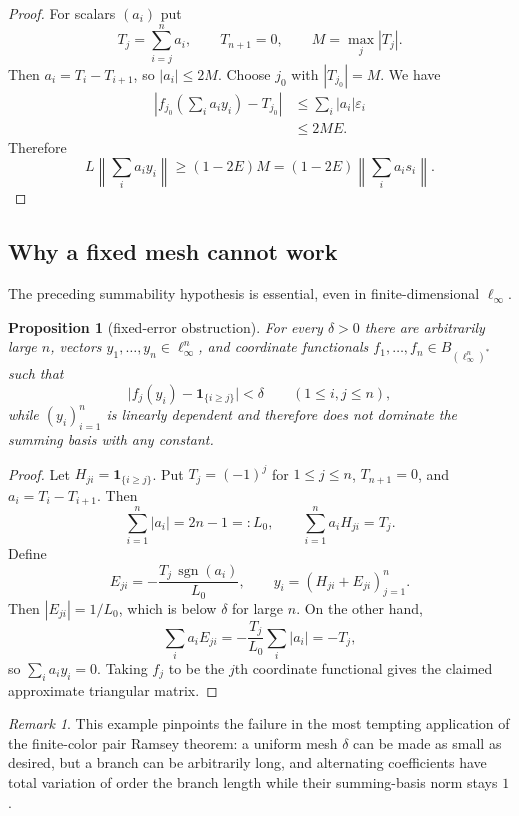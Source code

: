 \documentclass[11pt]{article}
\newtheorem{proposition}[theorem]{Proposition}
\theoremstyle{definition}
\theoremstyle{remark}
\newtheorem{remark}[theorem]{Remark}
\newcommand{\eps}{\varepsilon}
\begin{document}
\begin{proof}
For scalars $(a_i)$ put
\[
   T_j=\sum_{i=j}^n a_i,\qquad T_{n+1}=0,
   \qquad M=\max_j|T_j|.
\]
Then $a_i=T_i-T_{i+1}$, so $|a_i|\leq2M$.  Choose $j_0$ with $|T_{j_0}|=M$.  We have
\begin{align*}
 \left|f_{j_0}\left(\sum_i a_i y_i\right)-T_{j_0}\right|
 &\leq\sum_i|a_i|\eps_i\\
 &\leq2ME.
\end{align*}
Therefore
\[
  L\left\|\sum_i a_i y_i\right\|
  \geq (1-2E)M
  =(1-2E)\left\|\sum_i a_i s_i\right\|.
\]
\end{proof}

\subsection{Why a fixed mesh cannot work}

The preceding summability hypothesis is essential, even in finite-dimensional $\ell_\infty$.

\begin{proposition}[fixed-error obstruction]\label{prop:fixed-error-obstruction}
For every $\delta>0$ there are arbitrarily large $n$, vectors $y_1,\dots,y_n\in\ell_\infty^n$, and coordinate functionals $f_1,\dots,f_n\in B_{(\ell_\infty^n)^*}$ such that
\[
  \bigl|f_j(y_i)-\mathbf 1_{\{i\geq j\}}\bigr|<\delta
  \qquad(1\leq i,j\leq n),
\]
while $(y_i)_{i=1}^n$ is linearly dependent and therefore does not dominate the summing basis with any constant.
\end{proposition}

\begin{proof}
Let $H_{ji}=\mathbf 1_{\{i\geq j\}}$.  Put $T_j=(-1)^j$ for $1\leq j\leq n$, $T_{n+1}=0$, and $a_i=T_i-T_{i+1}$.  Then
\[
   \sum_{i=1}^n|a_i|=2n-1=:L_0,
   \qquad
   \sum_{i=1}^n a_iH_{ji}=T_j.
\]
Define
\[
   E_{ji}=-\frac{T_j\,\operatorname{sgn}(a_i)}{L_0},
   \qquad
   y_i=(H_{ji}+E_{ji})_{j=1}^n.
\]
Then $|E_{ji}|=1/L_0$, which is below $\delta$ for large $n$.  On the other hand,
\[
   \sum_i a_iE_{ji}
   =-\frac{T_j}{L_0}\sum_i|a_i|
   =-T_j,
\]
so $\sum_i a_i y_i=0$.  Taking $f_j$ to be the $j$th coordinate functional gives the claimed approximate triangular matrix.
\end{proof}

\begin{remark}
This example pinpoints the failure in the most tempting application of the finite-color pair Ramsey theorem: a uniform mesh $\delta$ can be made as small as desired, but a branch can be arbitrarily long, and alternating coefficients have total variation of order the branch length while their summing-basis norm stays $1$.
\end{remark}
\end{document}
